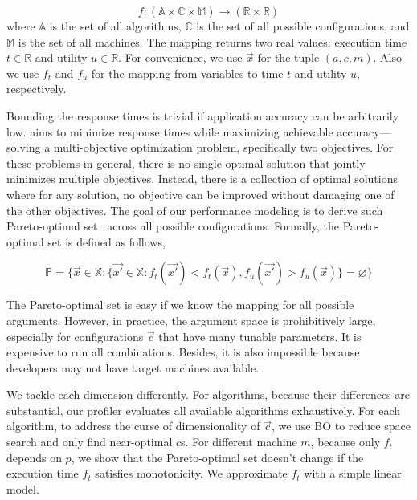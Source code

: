 {\small \vspace{-1em}
  \begin{equation*}
f: (\mathbb{A} \times \mathbb{C} \times \mathbb{M}) \rightarrow
(\mathbb{R}\times \mathbb{R})
\end{equation*}
} where $\mathbb{A}$ is the set of all algorithms, $\mathbb{C}$ is the set of
all possible configurations, and $\mathbb{M}$ is the set of all machines. The
mapping returns two real values: execution time $t \in \mathbb{R}$ and utility
$u \in \mathbb{R}$. For convenience, we use $\vec{x}$ for the tuple $(a, c, m)$.
Also we use $f_t$ and $f_u$ for the mapping from variables to time $t$ and
utility $u$, respectively.

Bounding the response times is trivial if application accuracy can be
arbitrarily low. \sysname{} aims to minimize response times while maximizing
achievable accuracy---solving a multi-objective optimization problem,
specifically two objectives. For these problems in general, there is no single
optimal solution that jointly minimizes multiple objectives. Instead, there is a
collection of optimal solutions where for any solution, no objective can be
improved without damaging one of the other objectives. The goal of our
performance modeling is to derive such Pareto-optimal
set~\cite{collette2013multiobjective} across all possible
configurations. Formally, the Pareto-optimal set is defined as follows,

{\small \vspace{-1.2em}
  \begin{equation}
    \mathbb{P} = \{ \vec{x} \in \mathbb{X} : \{ \vec{x'} \in \mathbb{X}:
    f_t(\vec{x'}) < f_t(\vec{x}), f_u(\vec{x'}) > f_u(\vec{x}) \} = \varnothing\}
  \label{eq:pareto}
\end{equation}
\vspace{-1.2em}
}

 The Pareto-optimal set is easy if we know the mapping for all
possible arguments. However, in practice, the argument space is prohibitively
large, especially for configurations $\vec{c}$ that have many tunable
parameters. It is expensive to run all combinations. Besides, it is also
impossible because developers may not have target machines available.

 We tackle each dimension differently. For algorithms,
because their differences are substantial, our profiler evaluates all available
algorithms exhaustively. For each algorithm, to address the curse of
dimensionality of $\vec{c}$, we use BO to reduce space search and only find
near-optimal $c$s. For different machine $m$, because only $f_t$ depends on $p$,
we show that the Pareto-optimal set doesn't change if the execution time $f_t$
satisfies monotonicity. We approximate $f_t$ with a simple linear model.


